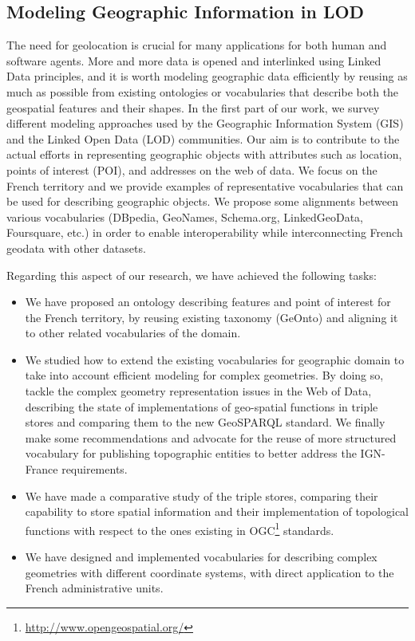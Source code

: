\subsection{Modeling Geographic Information in LOD}
The need for geolocation is crucial for many applications for both human and software agents. More and more data is opened and interlinked using Linked Data principles, and it is worth modeling geographic data efficiently by reusing as much as possible from existing ontologies or vocabularies that describe both the geospatial features and their shapes. In the first part of our work, we survey different modeling approaches used by the Geographic Information System (GIS) and the Linked Open Data (LOD) communities. Our aim is to contribute to the actual efforts in representing geographic objects with attributes such as location, points of interest (POI), and addresses on the web of data. We focus on the French territory and we provide examples of representative vocabularies that can be used for describing geographic objects. We propose some alignments between various vocabularies (DBpedia, GeoNames, Schema.org, LinkedGeoData, Foursquare, etc.) in order to enable interoperability while interconnecting French geodata with other datasets. 

Regarding this aspect of our research, we have achieved the following tasks:
 \begin{itemize}
  \item We have proposed an ontology describing features and point of interest for the French territory, by reusing existing taxonomy (GeOnto) and aligning it to other related vocabularies of the domain.
  \item  We studied how to extend the existing vocabularies for geographic domain to take into account efficient modeling for complex geometries. By doing so, tackle the complex geometry representation issues in the Web of Data, describing the state of implementations of geo-spatial functions in triple stores and comparing them to the new GeoSPARQL standard.  We finally make some recommendations and advocate for the reuse of more structured vocabulary for publishing topographic entities to better address the IGN-France requirements.
  
 \item We have made a comparative study of the triple stores, comparing their capability to store spatial information and their implementation of topological functions with respect to the ones 
existing in OGC\footnote{\url{http://www.opengeospatial.org/}} standards.
 \item  We have designed and implemented vocabularies for describing complex geometries with different coordinate systems, with direct application to the French administrative units.
 

\end{itemize}

